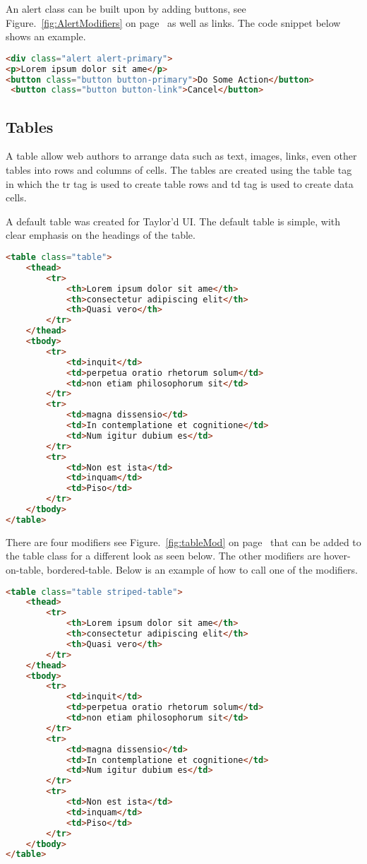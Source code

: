 An alert class can be built upon by adding buttons, see Figure.~\ref{fig:AlertModifiers} on  page~\pageref{fig:AlertModifiers} as well as links. The code snippet below shows an example.
 
\begin{lstlisting}[language=HTML]
<div class="alert alert-primary">
<p>Lorem ipsum dolor sit ame</p>
<button class="button button-primary">Do Some Action</button>
 <button class="button button-link">Cancel</button>
\end{lstlisting}

\subsection*{Tables}
A table allow web authors to arrange data such as text, images, links, even other tables into rows and columns of cells. The tables are created using the table tag in which the tr tag is used to create table rows and td tag is used to create data cells.

A default table was created for Taylor'd UI. The default table is simple, with clear emphasis on the headings of the table. 

\begin{lstlisting}[language=HTML]
<table class="table">
	<thead>
		<tr>
			<th>Lorem ipsum dolor sit ame</th>
			<th>consectetur adipiscing elit</th>
			<th>Quasi vero</th>
		</tr>
	</thead>
	<tbody>
		<tr>
			<td>inquit</td>
			<td>perpetua oratio rhetorum solum</td>
			<td>non etiam philosophorum sit</td>
		</tr>
		<tr>
			<td>magna dissensio</td>
			<td>In contemplatione et cognitione</td>
			<td>Num igitur dubium es</td>
		</tr>
		<tr>
			<td>Non est ista</td>
			<td>inquam</td>
			<td>Piso</td>
		</tr>
	</tbody>
</table>
\end{lstlisting}

There are four modifiers see  Figure.~\ref{fig:tableMod} on  page~\pageref{fig:tableMod} that can be added to the table class for a different look as seen below. The other modifiers are hover-on-table,  bordered-table. Below is an example of how to call one of the modifiers. 

\begin{lstlisting}[language=HTML]
<table class="table striped-table">
	<thead>
		<tr>
			<th>Lorem ipsum dolor sit ame</th>
			<th>consectetur adipiscing elit</th>
			<th>Quasi vero</th>
		</tr>
	</thead>
	<tbody>
		<tr>
			<td>inquit</td>
			<td>perpetua oratio rhetorum solum</td>
			<td>non etiam philosophorum sit</td>
		</tr>
		<tr>
			<td>magna dissensio</td>
			<td>In contemplatione et cognitione</td>
			<td>Num igitur dubium es</td>
		</tr>
		<tr>
			<td>Non est ista</td>
			<td>inquam</td>
			<td>Piso</td>
		</tr>
	</tbody>
</table>
\end{lstlisting}

